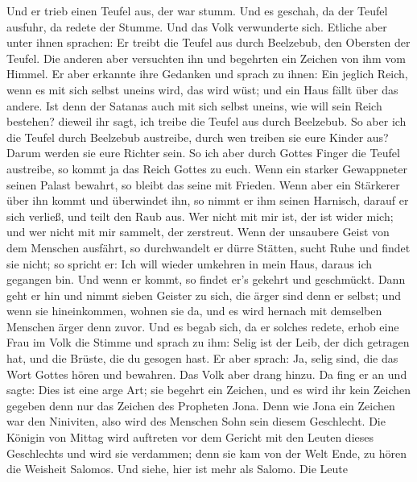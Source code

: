  Und er trieb einen Teufel aus, der war stumm. Und es
geschah, da der Teufel ausfuhr, da redete der Stumme. Und das Volk
verwunderte sich.  Etliche aber unter ihnen sprachen: Er
treibt die Teufel aus durch Beelzebub, den Obersten der Teufel.
 Die anderen aber versuchten ihn und begehrten ein
Zeichen von ihm vom Himmel.  Er aber erkannte ihre
Gedanken und sprach zu ihnen: Ein jeglich Reich, wenn es mit sich selbst
uneins wird, das wird wüst; und ein Haus fällt über das andere.
 Ist denn der Satanas auch mit sich selbst uneins, wie
will sein Reich bestehen? dieweil ihr sagt, ich treibe die Teufel aus
durch Beelzebub.  So aber ich die Teufel durch Beelzebub
austreibe, durch wen treiben sie eure Kinder aus? Darum werden sie eure
Richter sein.  So ich aber durch Gottes Finger die Teufel
austreibe, so kommt ja das Reich Gottes zu euch.  Wenn
ein starker Gewappneter seinen Palast bewahrt, so bleibt das seine mit
Frieden.  Wenn aber ein Stärkerer über ihn kommt und
überwindet ihn, so nimmt er ihm seinen Harnisch, darauf er sich verließ,
und teilt den Raub aus.  Wer nicht mit mir ist, der ist
wider mich; und wer nicht mit mir sammelt, der zerstreut.
 Wenn der unsaubere Geist von dem Menschen ausfährt, so
durchwandelt er dürre Stätten, sucht Ruhe und findet sie nicht; so
spricht er: Ich will wieder umkehren in mein Haus, daraus ich gegangen
bin.  Und wenn er kommt, so findet er's gekehrt und
geschmückt.  Dann geht er hin und nimmt sieben Geister zu
sich, die ärger sind denn er selbst; und wenn sie hineinkommen, wohnen
sie da, und es wird hernach mit demselben Menschen ärger denn zuvor.
 Und es begab sich, da er solches redete, erhob eine Frau
im Volk die Stimme und sprach zu ihm: Selig ist der Leib, der dich
getragen hat, und die Brüste, die du gesogen hast.  Er
aber sprach: Ja, selig sind, die das Wort Gottes hören und bewahren.
 Das Volk aber drang hinzu. Da fing er an und sagte: Dies
ist eine arge Art; sie begehrt ein Zeichen, und es wird ihr kein Zeichen
gegeben denn nur das Zeichen des Propheten Jona.  Denn
wie Jona ein Zeichen war den Niniviten, also wird des Menschen Sohn sein
diesem Geschlecht.  Die Königin von Mittag wird auftreten
vor dem Gericht mit den Leuten dieses Geschlechts und wird sie
verdammen; denn sie kam von der Welt Ende, zu hören die Weisheit
Salomos. Und siehe, hier ist mehr als Salomo.  Die Leute
